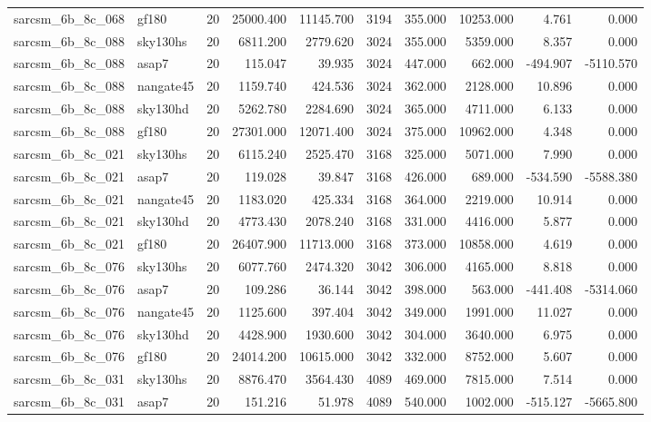 \begin{tabular}{llrrrrrrrr}
sarcsm\_6b\_8c\_068 & gf180 & 20 & 25000.400 & 11145.700 & 3194 & 355.000 & 10253.000 & 4.761 & 0.000 \\
sarcsm\_6b\_8c\_088 & sky130hs & 20 & 6811.200 & 2779.620 & 3024 & 355.000 & 5359.000 & 8.357 & 0.000 \\
sarcsm\_6b\_8c\_088 & asap7 & 20 & 115.047 & 39.935 & 3024 & 447.000 & 662.000 & -494.907 & -5110.570 \\
sarcsm\_6b\_8c\_088 & nangate45 & 20 & 1159.740 & 424.536 & 3024 & 362.000 & 2128.000 & 10.896 & 0.000 \\
sarcsm\_6b\_8c\_088 & sky130hd & 20 & 5262.780 & 2284.690 & 3024 & 365.000 & 4711.000 & 6.133 & 0.000 \\
sarcsm\_6b\_8c\_088 & gf180 & 20 & 27301.000 & 12071.400 & 3024 & 375.000 & 10962.000 & 4.348 & 0.000 \\
sarcsm\_6b\_8c\_021 & sky130hs & 20 & 6115.240 & 2525.470 & 3168 & 325.000 & 5071.000 & 7.990 & 0.000 \\
sarcsm\_6b\_8c\_021 & asap7 & 20 & 119.028 & 39.847 & 3168 & 426.000 & 689.000 & -534.590 & -5588.380 \\
sarcsm\_6b\_8c\_021 & nangate45 & 20 & 1183.020 & 425.334 & 3168 & 364.000 & 2219.000 & 10.914 & 0.000 \\
sarcsm\_6b\_8c\_021 & sky130hd & 20 & 4773.430 & 2078.240 & 3168 & 331.000 & 4416.000 & 5.877 & 0.000 \\
sarcsm\_6b\_8c\_021 & gf180 & 20 & 26407.900 & 11713.000 & 3168 & 373.000 & 10858.000 & 4.619 & 0.000 \\
sarcsm\_6b\_8c\_076 & sky130hs & 20 & 6077.760 & 2474.320 & 3042 & 306.000 & 4165.000 & 8.818 & 0.000 \\
sarcsm\_6b\_8c\_076 & asap7 & 20 & 109.286 & 36.144 & 3042 & 398.000 & 563.000 & -441.408 & -5314.060 \\
sarcsm\_6b\_8c\_076 & nangate45 & 20 & 1125.600 & 397.404 & 3042 & 349.000 & 1991.000 & 11.027 & 0.000 \\
sarcsm\_6b\_8c\_076 & sky130hd & 20 & 4428.900 & 1930.600 & 3042 & 304.000 & 3640.000 & 6.975 & 0.000 \\
sarcsm\_6b\_8c\_076 & gf180 & 20 & 24014.200 & 10615.000 & 3042 & 332.000 & 8752.000 & 5.607 & 0.000 \\
sarcsm\_6b\_8c\_031 & sky130hs & 20 & 8876.470 & 3564.430 & 4089 & 469.000 & 7815.000 & 7.514 & 0.000 \\
sarcsm\_6b\_8c\_031 & asap7 & 20 & 151.216 & 51.978 & 4089 & 540.000 & 1002.000 & -515.127 & -5665.800 \\

\end{tabular}
